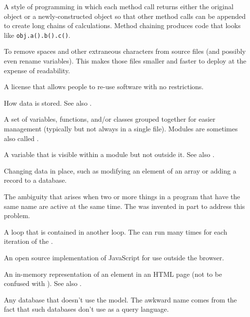 \begin{description}
A style of programming in which each method call returns either the original object or a newly-constructed object
so that other method calls can be appended to create long chains of calculations.
Method chaining produces code that looks like \texttt{obj.a().b().c()}.

To remove spaces and other extraneous characters from source files (and
possibly even rename variables). This makes those files smaller and faster to
deploy at the expense of readability.

A license that allows people to re-use software with no restrictions.

How data is stored.
See also .

A set of variables, functions, and/or classes grouped together for easier
management (typically but not always in a single file). Modules are sometimes
also called .

A variable that is visible within a module but not outside it.
See also .

Changing data in place, such as modifying an element of an array or adding a
record to a database.

The ambiguity that arises when two or more things in a program that have the
same name are active at the same time. The  was
invented in part to address this problem.

A loop that is contained in another loop. The 
can run many times for each iteration of the .

An open source implementation of JavaScript for use outside the browser.

An in-memory representation of an element in an HTML page
(not to be confused with ).
See also .

Any database that doesn't use the  model.
The awkward name comes from the fact that such databases don't use
 as a query language.


\end{description}
